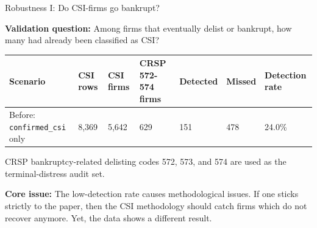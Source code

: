 \documentclass[10pt]{beamer}\usepackage[]{graphicx}\usepackage[table]{xcolor}
\begin{document}
\begin{frame}{Robustness I: Do CSI-firms go bankrupt?}

\textbf{Validation question:} Among firms that eventually delist or bankrupt, how many had already been classified as CSI?

\vspace{0.25em}
\begin{table}[ht]
\centering
\scriptsize
\setlength{\tabcolsep}{2.5pt}
\begin{tabular}{L{3.15cm}R{1.2cm}R{1.0cm}R{1.45cm}R{1.0cm}R{1.0cm}R{1.35cm}}
\toprule
Scenario & CSI rows & CSI firms & CRSP 572-574 firms & Detected & Missed & Detection rate \\
\midrule
Before: \texttt{confirmed\_csi} only & 8,369 & 5,642 & 629 & 151 & 478 & 24.0\% \\
\bottomrule
\end{tabular}
\end{table}

\vspace{0.35em}

{\scriptsize CRSP bankruptcy-related delisting codes 572, 573, and 574 are used as the terminal-distress audit set.}

\vspace{0.45em}

\textbf{Core issue:} The low-detection rate causes methodological issues. If one sticks strictly to the paper, 
then the CSI methodology should catch firms which do not recover anymore. Yet, the data shows a different result.


\end{frame}

\end{document}
